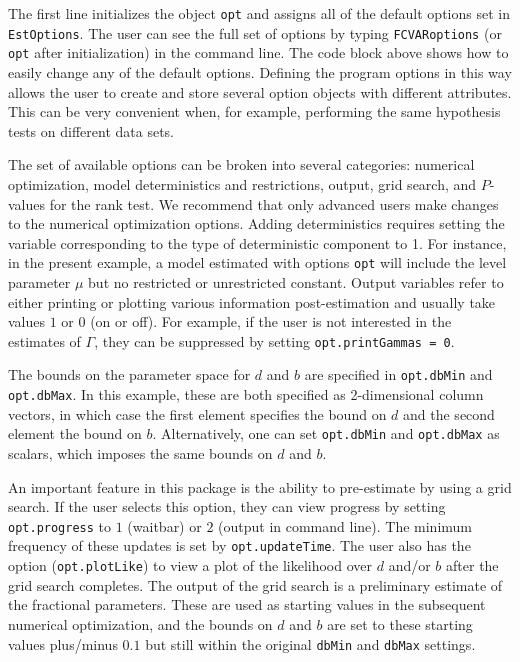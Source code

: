 \documentclass[article]{jss}
\begin{document}
The first line initializes the object \verb|opt| and assigns all of the default options set in \verb|EstOptions|. The user can see the full set of options by typing \verb|FCVARoptions| (or \verb|opt| after initialization) in the command line. %
The code block above 
shows how to easily change any of the default options. Defining the program options in this way allows the user to create and store several option objects with different attributes. This can be very convenient when, for example, performing the same hypothesis tests on different data sets. 

The set of available options can be broken into several categories: numerical optimization, model deterministics and restrictions, output, grid search, and $P$-values for the rank test. We recommend that only advanced users make changes to the numerical optimization options. Adding deterministics requires setting the variable corresponding to the type of deterministic component to 1. For instance, in the present example, a model estimated with options \verb|opt| will include the level parameter $\mu$ but no restricted or unrestricted constant. Output variables refer to either printing or plotting various information post-estimation and usually take values $1$ or $0$ (on or off). For example, if the user is not interested in the estimates of $\Gamma$, they can be suppressed by setting \verb|opt.printGammas = 0|.

The bounds on the parameter space for $d$ and $b$ are specified in \verb|opt.dbMin| and \verb|opt.dbMax|. In this example, these are both specified as 2-dimensional column vectors, in which case the first element specifies the bound on $d$ and the second element the bound on $b$. Alternatively, one can set \verb|opt.dbMin| and \verb|opt.dbMax| as scalars, which imposes the same bounds on $d$ and $b$. 

An important feature in this package is the ability to pre-estimate by using a grid search. If the user selects this option, they can view progress by setting \verb|opt.progress| to $1$ (waitbar) or $2$ (output in command line). The minimum frequency of these updates is set by \verb|opt.updateTime|. The user also has the option (\verb|opt.plotLike|) to view a plot of the likelihood over $d$ and/or $b$ after the grid search completes. The output of the grid search is a preliminary estimate of the fractional parameters. These are used as starting values in the subsequent numerical optimization, and the bounds on $d$ and $b$ are set to these starting values plus/minus $0.1$ but still within the original \verb|dbMin| and \verb|dbMax| settings.
\end{document}

